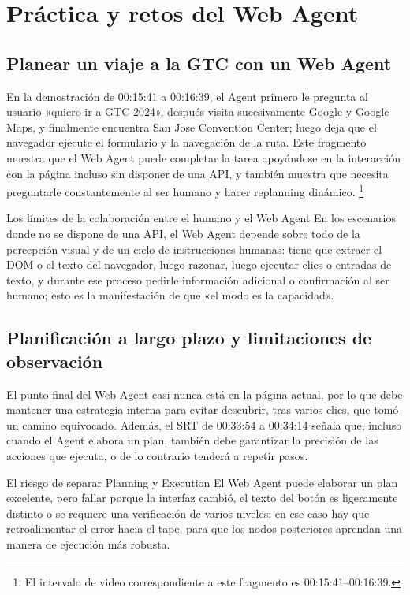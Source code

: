 \documentclass[a4paper]{article}
\begin{document}
\section{Práctica y retos del Web Agent}
\subsection{Planear un viaje a la GTC con un Web Agent}
En la demostración de 00:15:41 a 00:16:39, el Agent primero le pregunta al usuario «quiero ir a GTC 2024», después visita sucesivamente Google y Google Maps, y finalmente encuentra San Jose Convention Center; luego deja que el navegador ejecute el formulario y la navegación de la ruta. Este fragmento muestra que el Web Agent puede completar la tarea apoyándose en la interacción con la página incluso sin disponer de una API, y también muestra que necesita preguntarle constantemente al ser humano y hacer replanning dinámico.
\footnote{El intervalo de video correspondiente a este fragmento es 00:15:41--00:16:39.}

\begin{importantbox}{Los límites de la colaboración entre el humano y el Web Agent}
En los escenarios donde no se dispone de una API, el Web Agent depende sobre todo de la percepción visual y de un ciclo de instrucciones humanas: tiene que extraer el DOM o el texto del navegador, luego razonar, luego ejecutar clics o entradas de texto, y durante ese proceso pedirle información adicional o confirmación al ser humano; esto es la manifestación de que «el modo es la capacidad».
\end{importantbox}

\subsection{Planificación a largo plazo y limitaciones de observación}
El punto final del Web Agent casi nunca está en la página actual, por lo que debe mantener una estrategia interna para evitar descubrir, tras varios clics, que tomó un camino equivocado. Además, el SRT de 00:33:54 a 00:34:14 señala que, incluso cuando el Agent elabora un plan, también debe garantizar la precisión de las acciones que ejecuta, o de lo contrario tenderá a repetir pasos.

\begin{warningbox}{El riesgo de separar Planning y Execution}
El Web Agent puede elaborar un plan excelente, pero fallar porque la interfaz cambió, el texto del botón es ligeramente distinto o se requiere una verificación de varios niveles; en ese caso hay que retroalimentar el error hacia el tape, para que los nodos posteriores aprendan una manera de ejecución más robusta.
\end{warningbox}
\end{document}
